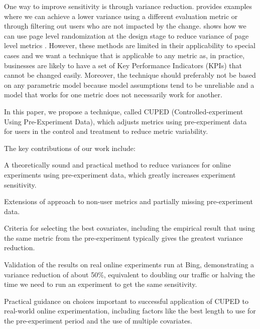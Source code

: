\documentclass{sig-alternate}
\begin{document}



 


One way to improve sensitivity is through variance reduction. \citet{expsurvey} provides examples where we can achieve a lower variance using a different evaluation metric or through filtering out users who are not impacted by the change. \citet{choiceofexp} shows how we can use page level randomization at the design stage to reduce variance of page level metrics \citep{Chapelle}. However, these methods are limited in their applicability to special cases and we want a technique that is applicable to any metric as, in practice, businesses are likely to have a set of Key Performance Indicators (KPIs) that cannot be changed easily. Moreover, the technique should preferably not be based on any parametric model because model assumptions tend to be unreliable and a model that works for one metric does not necessarily work for another.

In this paper, we propose a technique, called CUPED \linebreak (Controlled-experiment Using Pre-Experiment Data), which adjusts metrics using pre-experiment data for users in the control and treatment to reduce metric variability.

The key contributions of our work include:
\begin{compactitem}
\item A theoretically sound and practical method to reduce variances for online experiments using pre-experiment data, which greatly increases experiment sensitivity.
\item Extensions of approach to non-user metrics and partially missing pre-experiment data.
\item Criteria for selecting the best covariates, including the empirical result that using the same metric from the pre-experiment typically gives the greatest variance reduction.
\item Validation of the results on real online experiments run at Bing, demonstrating a variance reduction of about 50\%, equivalent to doubling our traffic or halving the time we need to run an experiment to get the same sensitivity.
\item Practical guidance on choices important to successful application of CUPED to real-world online experimentation, including factors like the best length to use for the pre-experiment period and the use of multiple covariates.
\end{compactitem}
\end{document}
